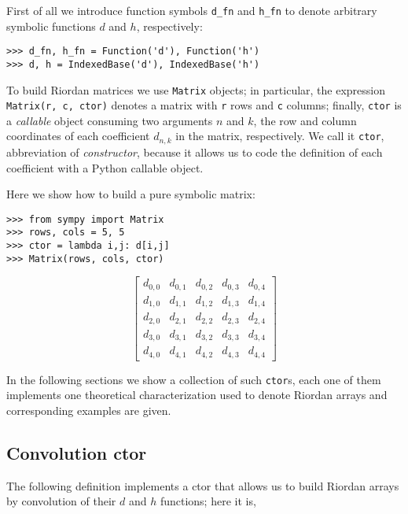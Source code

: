 First of all we introduce function symbols \verb|d_fn| and \verb|h_fn|
to denote arbitrary symbolic functions $d$ and $h$, respectively:
\begin{verbatim}
>>> d_fn, h_fn = Function('d'), Function('h')
>>> d, h = IndexedBase('d'), IndexedBase('h')
\end{verbatim}

To build Riordan matrices we use \verb|Matrix| objects; in particular, the
expression \verb|Matrix(r, c, ctor)| denotes a matrix with \verb|r| rows and
\verb|c| columns; finally, \verb|ctor| is a \textit{callable} object consuming
two arguments $n$ and $k$, the row and column coordinates of each coefficient
$d_{n,k}$ in the matrix, respectively. We call it \verb|ctor|, abbreviation of
\textit{constructor}, because it allows us to code the definition of each
coefficient with a Python callable object.

Here we show how to build a pure symbolic matrix:
\begin{verbatim}
>>> from sympy import Matrix
>>> rows, cols = 5, 5
>>> ctor = lambda i,j: d[i,j]
>>> Matrix(rows, cols, ctor)
\end{verbatim}
\begin{displaymath}
\left[\begin{matrix}d_{0,0} & d_{0,1} & d_{0,2} & d_{0,3} & d_{0,4}\\d_{1,0} & d_{1,1} & d_{1,2} & d_{1,3} & d_{1,4}\\d_{2,0} & d_{2,1} & d_{2,2} & d_{2,3} & d_{2,4}\\d_{3,0} & d_{3,1} & d_{3,2} & d_{3,3} & d_{3,4}\\d_{4,0} & d_{4,1} & d_{4,2} & d_{4,3} & d_{4,4}\end{matrix}\right]
\end{displaymath}

In the following sections we show a collection of such \verb|ctor|s, each one
of them implements one theoretical characterization used to denote Riordan
arrays and corresponding examples are given.

\subsection{Convolution ctor}

The following definition implements a ctor that allows us to build Riordan
arrays by convolution of their $d$ and $h$ functions; here it is,


